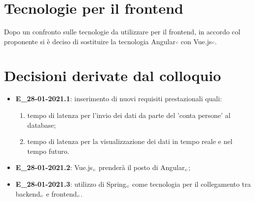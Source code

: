 \section{Tecnologie per il frontend}
Dopo un confronto sulle tecnologie da utilizzare per il frontend, in accordo col proponente si è deciso di sostituire la tecnologia Angular${\scaleto{G}{3pt}}$ con Vue.js${\scaleto{G}{3pt}}$.

\section{Decisioni derivate dal colloquio}
\begin{itemize}
	\item \textbf{E\_28-01-2021.1}: inserimento di nuovi requisiti prestazionali quali:
		\begin{enumerate}
			\item tempo di latenza per l'invio dei dati da parte del 'conta persone' al database;
			\item tempo di latenza per la visualizzazione dei dati in tempo reale e nel tempo futuro.
		\end{enumerate}
	\item \textbf{E\_28-01-2021.2}: Vue.js$_{\scaleto{G}{3pt}}$ prenderà il posto di Angular$_{\scaleto{G}{3pt}}$;
	\item \textbf{E\_28-01-2021.3}: utilizzo di Spring$_{\scaleto{G}{3pt}}$ come tecnologia per il collegamento tra backend$_{\scaleto{G}{3pt}}$ e frontend$_{\scaleto{G}{3pt}}$.
\end{itemize}
